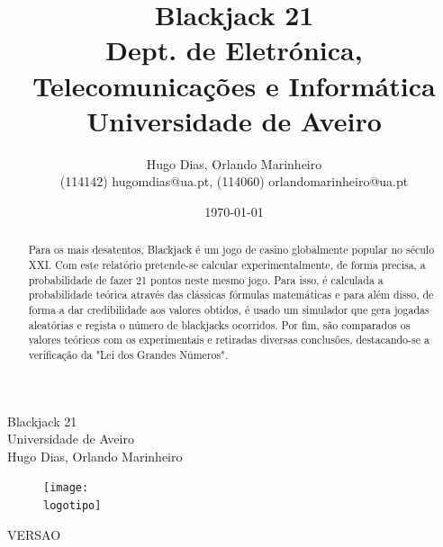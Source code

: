 \documentclass{report}
\begin{document}
%
\def\titulo{Blackjack 21}
\def\data{DATA}
\def\autores{Hugo Dias, Orlando Marinheiro}
\def\autorescontactos{(114142) hugomdias@ua.pt, (114060) orlandomarinheiro@ua.pt}
\def\versao{VERSAO}
\def\departamento{Dept. de Eletrónica, Telecomunicações e Informática}
\def\empresa{Universidade de Aveiro}
\def\logotipo{fotos/ua.pdf}
%
%
\begin{titlepage}

\begin{center}
%
\vspace*{50mm}
%
{\Huge \titulo}\\ 
%
\vspace{10mm}
%
{\Large \empresa}\\
%
\vspace{10mm}
%
{\LARGE \autores}\\ 
%
\vspace{30mm}
%
\begin{figure}[h]
\center
\texttt{[image: \\logotipo]}
\end{figure}
%
\vspace{30mm}
\end{center}
%
\begin{flushright}
\versao
\end{flushright}
\end{titlepage}

\title{%
{\Huge\textbf{\titulo}}\\
{\Large \departamento\\ \empresa}
}
%
\author{%
    \autores \\
    \autorescontactos
}
%
\date{\today}
%
\maketitle


\begin{abstract}
Para os mais desatentos, Blackjack é um jogo de casino globalmente popular no século XXI. Com este relatório pretende-se calcular experimentalmente, de forma precisa, a probabilidade de fazer 21 pontos neste mesmo jogo. Para isso, é calculada a probabilidade teórica através das clássicas fórmulas matemáticas e para além disso, de forma a dar credibilidade aos valores obtidos, é usado um simulador que gera jogadas aleatórias e regista o número de blackjacks ocorridos. Por fim, são comparados os valores teóricos com os experimentais e retiradas diversas conclusões, destacando-se a verificação da "Lei dos Grandes Números".\\
\end{abstract}
\end{document}
